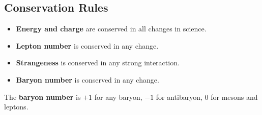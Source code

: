 \subsection{Conservation Rules}
\begin{itemize}
    \item \textbf{Energy and charge} are conserved in all changes in science.
    \item \textbf{Lepton number} is conserved in any change.
    \item \textbf{Strangeness} is conserved in any strong interaction.
    \item \textbf{Baryon number} is conserved in any change.
\end{itemize}

The \textbf{baryon number} is $+1$ for any baryon, $-1$ for antibaryon, 0 for mesons and leptons.

